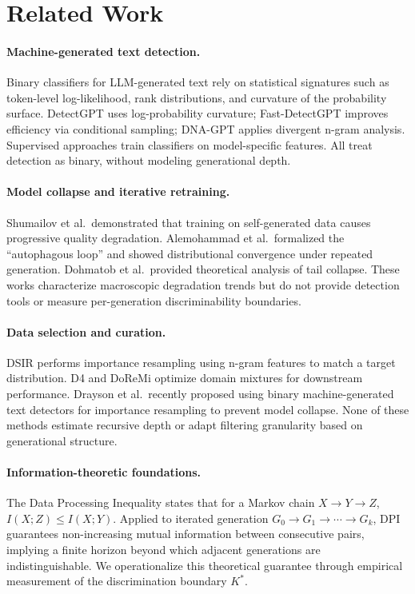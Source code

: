 \documentclass[11pt,a4paper]{article}
\begin{document}
\section{Related Work}

\paragraph{Machine-generated text detection.}
Binary classifiers for LLM-generated text rely on statistical signatures such as token-level log-likelihood, rank distributions, and curvature of the probability surface. DetectGPT uses log-probability curvature; Fast-DetectGPT improves efficiency via conditional sampling; DNA-GPT applies divergent n-gram analysis. Supervised approaches train classifiers on model-specific features. All treat detection as binary, without modeling generational depth.

\paragraph{Model collapse and iterative retraining.}
Shumailov et al.\ demonstrated that training on self-generated data causes progressive quality degradation. Alemohammad et al.\ formalized the ``autophagous loop'' and showed distributional convergence under repeated generation. Dohmatob et al.\ provided theoretical analysis of tail collapse. These works characterize macroscopic degradation trends but do not provide detection tools or measure per-generation discriminability boundaries.

\paragraph{Data selection and curation.}
DSIR performs importance resampling using n-gram features to match a target distribution. D4 and DoReMi optimize domain mixtures for downstream performance. Drayson et al.\ recently proposed using binary machine-generated text detectors for importance resampling to prevent model collapse. None of these methods estimate recursive depth or adapt filtering granularity based on generational structure.

\paragraph{Information-theoretic foundations.}
The Data Processing Inequality states that for a Markov chain $X \to Y \to Z$, $I(X;Z) \leq I(X;Y)$. Applied to iterated generation $G_0 \to G_1 \to \cdots \to G_k$, DPI guarantees non-increasing mutual information between consecutive pairs, implying a finite horizon beyond which adjacent generations are indistinguishable. We operationalize this theoretical guarantee through empirical measurement of the discrimination boundary $K^*$.
\end{document}
